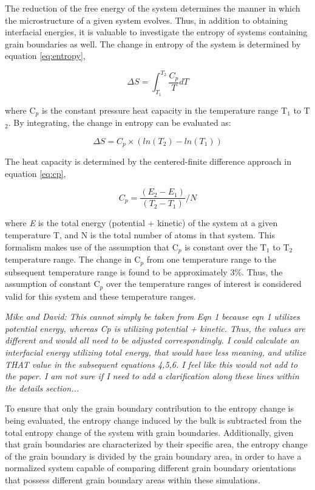 \documentclass[review]{elsarticle}
\begin{document}
The reduction of the free energy of the system determines the manner in which the microstructure of a given system evolves. Thus, in addition to obtaining interfacial energies, it is valuable to investigate the entropy of systems containing grain boundaries as well. The change in entropy of the system is determined by equation \ref{eq:entropy},

\begin{equation}
\label{eq:entropy}
\Delta S = \int_{T_{1}}^{T_{2}} \frac{C_{p}}{T} dT
\end{equation}

where C$_{p}$ is the constant pressure heat capacity in the temperature range T$_{1}$ to T$_{2}$. By integrating, the change in entropy can be evaluated as:

\begin{equation}
\label{eq:entropy2}
\Delta S = C_{p} \times (ln(T_{2}) - ln(T_{1})) 
\end{equation}

The heat capacity is determined by the centered-finite difference approach in equation \ref{eq:cp},

\begin{equation}
\label{eq:cp}
C_{p} = \frac{(E_{2} - E_{1})}{(T_{2} - T_{1})} / N
\end{equation}

where \textit{E} is the total energy (potential + kinetic) of the system at a given temperature T, and N is the total number of atoms in that system. This formalism makes use of the assumption that C$_{p}$ is constant over the T$_{1}$ to T$_{2}$ temperature range. The change in C$_{p}$ from one temperature range to the subsequent temperature range is found to be approximately 3$\%$. Thus, the assumption of constant C$_{p}$ over the temperature ranges of interest is considered valid for this system and these temperature ranges. 

\textit{\color{blue}Mike and David: This cannot simply be taken from Eqn 1 because eqn 1 utilizes potential energy, whereas Cp is utilizing potential + kinetic. Thus, the values are different and would all need to be adjusted correspondingly. I could calculate an interfacial energy utilizing total energy, that would have less meaning, and utilize THAT value in the subsequent equations 4,5,6. I feel like this would not add to the paper. I am not sure if I need to add a clarification along these lines within the details section... }

To ensure that only the grain boundary contribution to the entropy change is being evaluated, the entropy change induced by the bulk is subtracted from the total entropy change of the system with grain boundaries. Additionally, given that grain boundaries are characterized by their specific area, the entropy change of the grain boundary is divided by the grain boundary area, in order to have a normalized system capable of comparing different grain boundary orientations that possess different grain boundary areas within these simulations. 
\end{document}

